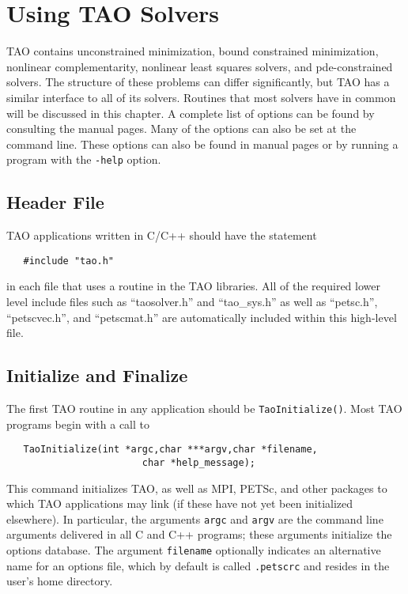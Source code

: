 %
%

\chapter{Using TAO Solvers}
\label{chapter:tao_solver}

TAO contains unconstrained minimization, bound constrained minimization, 
nonlinear complementarity, nonlinear least squares solvers, and pde-constrained
solvers.
The structure of these problems can differ significantly, 
but TAO has a similar interface to all of its solvers.  
Routines that most solvers have in common will be discussed in 
this chapter.
A complete list of options can be found by consulting the manual pages.
Many of the options can also be set at the command line.  These options
can also be found in manual pages or by
running a program with the {\tt -help} option.

\section{Header File}

TAO applications written in C/C++ should have the statement 
\begin{verbatim}
   #include "tao.h"
\end{verbatim}
\noindent
in each file that uses a routine in the TAO libraries.
All of the required lower level include files such as ``taosolver.h''
and ``tao\_sys.h'' as well as ``petsc.h'', ``petscvec.h'', and ``petscmat.h''
are automatically included within this high-level file.


\section{Initialize and Finalize}

The first TAO routine in any application should be {\tt TaoInitialize()}.
Most TAO programs begin with a call to
\begin{verbatim}
   TaoInitialize(int *argc,char ***argv,char *filename, 
                        char *help_message);
\end{verbatim}
\noindent
This command initializes TAO, as well as MPI, PETSc, and other packages
to which TAO applications may link (if these have not yet
been initialized elsewhere).  
In particular, the arguments {\tt argc} and 
{\tt argv} are the command line arguments delivered in all C and C++
programs; these arguments initialize the options database.  
 The argument {\tt filename}
optionally indicates an alternative name for an options file, which by
default is called {\tt .petscrc} and resides in the user's home directory.

